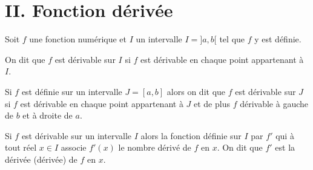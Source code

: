 \documentclass[12pt,a4paper]{article}
\begin{document}
\begin{tcolorbox}[mybox, title={Resumé}]
\begin{center}
\end{center}

\end{tcolorbox}


\section*{II. Fonction dérivée}


\begin{tcolorbox}[
    colback=green!5,
    colframe=green!60!black,
    colbacktitle=green!60!black,
    title=\textbf{1. Dérivé sur un intervalle},
    fonttitle=\bfseries,
    boxrule=0.8pt
]

Soit $f$ une fonction numérique et $I$ un intervalle
$I=]a,b[$ tel que $f$ y est définie.

On dit que $f$ est dérivable sur $I$ si $f$ est dérivable en
chaque point appartenant à $I$.

Si $f$ est définie sur un intervalle $J=[a,b]$ alors on dit que
$f$ est dérivable sur $J$ si $f$ est dérivable en chaque point
appartenant à $J$ et de plus $f$ dérivable à gauche de $b$ et à
droite de $a$.

Si $f$ est dérivable sur un intervalle $I$ alors la fonction
définie sur $I$ par $f'$ qui à tout réel $x\in I$ associe $f'(x)$
le nombre dérivé de $f$ en $x$. On dit que $f'$ est la dérivée
(dérivée) de $f$ en $x$.

\end{tcolorbox}

\end{document}
